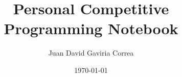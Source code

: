 \documentclass[8pt]{article}
\title{\vspace{-4ex}\Large{Personal Competitive Programming Notebook}}
\author{Juan David Gaviria Correa}
\date{\today}
\begin{document}
\begin{landscape}

\setlength{\columnseprule}{0.4pt}
\setlength{\columnsep}{40pt}
\begin{multicols}{2}

\maketitle
\vspace{-8.2ex}
\tableofcontents
\pagestyle{fancy}



\end{multicols}

\iffalse
Here we can introduce another LaTeX file if we want to, like this:
	\pagebreak
	\setlength{\columnseprule}{0pt}
	\begin{multicols}{2}
	
	\end{multicols}

	\pagebreak
\fi

\end{landscape}
\end{document}
